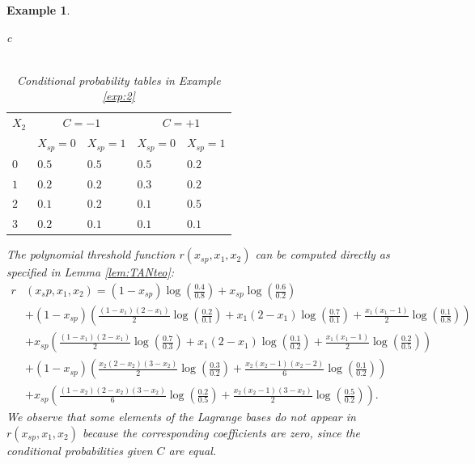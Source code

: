 \documentclass[11pt,a4paper, twoside]{book}
\newtheorem{example}{Example}[chapter]
\begin{document}
\begin{example}
\begin{table}[p]
\begin{tabular}{c}
 \\   \\
     \begin{tabular}{|l|l|l|l|l|}
    \hline
    $X_2$ & \multicolumn{2}{c|}{$C=-1$}  & \multicolumn{2}{c|}{$C=+1$ }   \\ \cline{1-5}
        &  $X_{sp}=0$  &  $X_{sp}=1$ &  $X_{sp}=0$  &  $X_{sp}=1$  \\ \hline    
    $0$ & $0.5$  & $0.5$ & $0.5$ & $0.2$    \\ \hline
    $1$ & $0.2$  & $0.2$ & $0.3$ & $0.2$    \\ \hline
    $2$ & $0.1$  & $0.2$ & $0.1$ & $0.5$    \\ \hline
    $3$ & $0.2$  & $0.1$ & $0.1$ & $0.1$    \\ \hline
    \end{tabular}
 \end{tabular}
 \caption{Conditional probability tables in Example \ref{exp:2} }
 \label{tab:cond tab 2}
\end{table}
The polynomial threshold function $r(x_{sp},x_1,x_2)$ can be computed directly as specified in Lemma \ref{lem:TANteo}:
\begin{align*}
r&(x_sp,x_1,x_2)= (1-x_{sp})\log\left(\frac{0.4}{0.8}\right)+x_{sp}\log\left(\frac{0.6}{0.2}\right) \\
&+(1-x_{sp})\left( \frac{(1-x_1)(2-x_1)}{2}\log\left(\frac{0.2}{0.1}\right) + x_1(2-x_1)\log\left(\frac{0.7}{0.1}\right)+\frac{x_1(x_1-1)}{2}\log\left(\frac{0.1}{0.8}\right) \right) \\
&+x_{sp}\left( \frac{(1-x_1)(2-x_1)}{2}\log\left(\frac{0.7}{0.3}\right) + x_1(2-x_1)\log\left(\frac{0.1}{0.2}\right)+\frac{x_1(x_1-1)}{2}\log\left(\frac{0.2}{0.5}\right) \right) \\
&+(1-x_{sp})\left(  \frac{x_2(2-x_2)(3-x_2)}{2}\log\left(\frac{0.3}{0.2}\right) + \frac{x_2(x_2-1)(x_2-2)}{6}\log\left(\frac{0.1}{0.2}\right)  \right)\\
&+x_{sp}\left(  \frac{(1-x_2)(2-x_2)(3-x_2)}{6}\log \left(\frac{0.2}{0.5}\right) + \frac{x_2(x_2-1)(3-x_2)}{2}\log\left(\frac{0.5}{0.2} \right) \right) .
\end{align*}
We observe that some elements of the Lagrange bases do not appear in $r(x_{sp},x_1,x_2)$ because the corresponding coefficients are zero, since the conditional probabilities given $C$ are equal.
\end{example}
\end{document}
